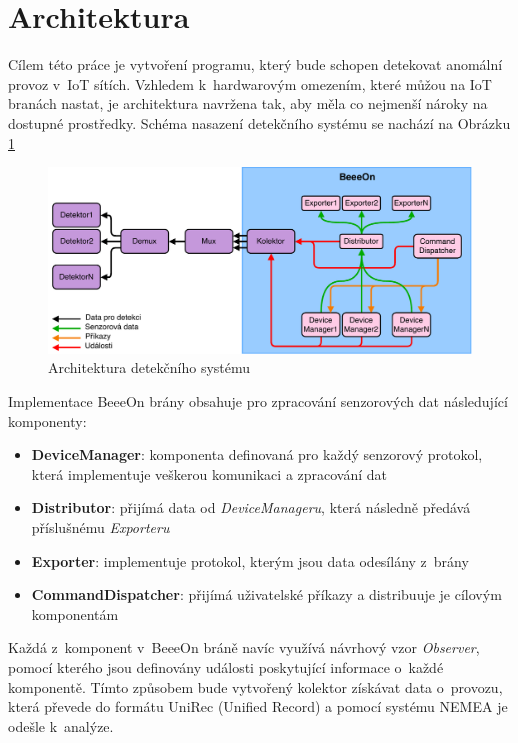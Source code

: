  \section{Architektura}
 Cílem této práce je vytvoření programu, který bude schopen detekovat anomální provoz v~IoT sítích. 
 Vzhledem k~hardwarovým omezením, které můžou na IoT branách nastat, je architektura navržena tak, aby
 měla co nejmenší nároky na dostupné prostředky. Schéma nasazení detekčního systému se nachází
 na Obrázku \ref{obr.deploy-arch}
 
 \begin{figure}[ht]
   \begin{center}
   \includegraphics[scale=0.52]{pictures/deploy-arch}
   \caption{Architektura detekčního systému}
   \label{obr.deploy-arch}
   \end{center}
   \end{figure}
 
 Implementace BeeeOn brány obsahuje pro zpracování senzorových dat následující komponenty:
 \begin{itemize}
  \item \textbf{DeviceManager}:
    komponenta definovaná pro každý senzorový protokol, která implementuje veškerou komunikaci
    a zpracování dat
    
  \item \textbf{Distributor}:  
  přijímá data od \textit{DeviceManageru}, která následně předává příslušnému \textit{Exporteru}
  
  \item \textbf{Exporter}:
  implementuje protokol, kterým jsou data odesílány z~brány
  
  \item \textbf{CommandDispatcher}:  
  přijímá uživatelské příkazy a distribuuje je cílovým komponentám
  
 \end{itemize}
 
 Každá z~komponent v~BeeeOn bráně navíc využívá návrhový vzor \textit{Observer}, pomocí kterého jsou
 definovány události poskytující informace o~každé komponentě. 
 Tímto způsobem bude vytvořený kolektor získávat data o~provozu, která
 převede do formátu UniRec (Unified Record) a pomocí systému NEMEA je odešle k~analýze.
 
